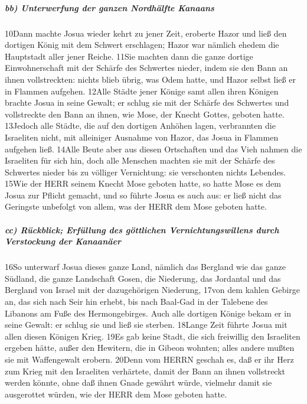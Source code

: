 \hypertarget{bb-unterwerfung-der-ganzen-nordhuxe4lfte-kanaans}{%
\subparagraph{bb) Unterwerfung der ganzen Nordhälfte
Kanaans}\label{bb-unterwerfung-der-ganzen-nordhuxe4lfte-kanaans}}

10Dann machte Josua wieder kehrt zu jener Zeit, eroberte Hazor und ließ
den dortigen König mit dem Schwert erschlagen; Hazor war nämlich ehedem
die Hauptstadt aller jener Reiche. 11Sie machten dann die ganze dortige
Einwohnerschaft mit der Schärfe des Schwertes nieder, indem sie den Bann
an ihnen vollstreckten: nichts blieb übrig, was Odem hatte, und Hazor
selbst ließ er in Flammen aufgehen. 12Alle Städte jener Könige samt
allen ihren Königen brachte Josua in seine Gewalt; er schlug sie mit der
Schärfe des Schwertes und vollstreckte den Bann an ihnen, wie Mose, der
Knecht Gottes, geboten hatte. 13Jedoch alle Städte, die auf den dortigen
Anhöhen lagen, verbrannten die Israeliten nicht, mit alleiniger Ausnahme
von Hazor, das Josua in Flammen aufgehen ließ. 14Alle Beute aber aus
diesen Ortschaften und das Vieh nahmen die Israeliten für sich hin, doch
alle Menschen machten sie mit der Schärfe des Schwertes nieder bis zu
völliger Vernichtung: sie verschonten nichts Lebendes. 15Wie der HERR
seinem Knecht Mose geboten hatte, so hatte Mose es dem Josua zur Pflicht
gemacht, und so führte Josua es auch aus: er ließ nicht das Geringste
unbefolgt von allem, was der HERR dem Mose geboten hatte.

\hypertarget{cc-ruxfcckblick-erfuxfcllung-des-guxf6ttlichen-vernichtungswillens-durch-verstockung-der-kanaanuxe4er}{%
\subparagraph{cc) Rückblick; Erfüllung des göttlichen
Vernichtungswillens durch Verstockung der
Kanaanäer}\label{cc-ruxfcckblick-erfuxfcllung-des-guxf6ttlichen-vernichtungswillens-durch-verstockung-der-kanaanuxe4er}}

16So unterwarf Josua dieses ganze Land, nämlich das Bergland wie das
ganze Südland, die ganze Landschaft Gosen, die Niederung, das Jordantal
und das Bergland von Israel mit der dazugehörigen Niederung, 17von dem
kahlen Gebirge an, das sich nach Seir hin erhebt, bis nach Baal-Gad in
der Talebene des Libanons am Fuße des Hermongebirges. Auch alle dortigen
Könige bekam er in seine Gewalt: er schlug sie und ließ sie sterben.
18Lange Zeit führte Josua mit allen diesen Königen Krieg. 19Es gab keine
Stadt, die sich freiwillig den Israeliten ergeben hätte, außer den
Hewitern, die in Gibeon wohnten; alles andere mußten sie mit
Waffengewalt erobern. 20Denn vom HERRN geschah es, daß er ihr Herz zum
Krieg mit den Israeliten verhärtete, damit der Bann an ihnen vollstreckt
werden könnte, ohne daß ihnen Gnade gewährt würde, vielmehr damit sie
ausgerottet würden, wie der HERR dem Mose geboten hatte.

